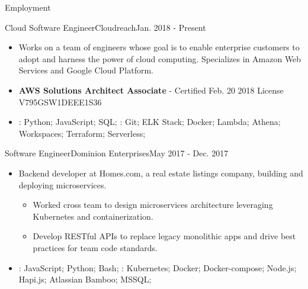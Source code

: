 \documentclass[]{mcdowellcv}
\begin{document}
    \makeheader

    \begin{cvsection}{Employment}


        \begin{cvsubsection}{Cloud Software Engineer}{Cloudreach}{Jan. 2018 - Present}
            \begin{itemize}
                \item Works on a team of engineers whose goal is to enable enterprise customers to adopt and harness the power of cloud computing. 
                Specializes in Amazon Web Services and Google Cloud Platform.
                \item \textbf{AWS Solutions Architect Associate} - Certified Feb. 20 2018  License V795GSW1DEEE1S36
            \end{itemize}
            \begin{itemize}
                 \item {}: Python; JavaScript; SQL; \newline
                : Git; ELK Stack; Docker; Lambda; Athena; Workspaces; Terraform; Serverless;
            \end{itemize}
        \end{cvsubsection}

        \begin{cvsubsection}{Software Engineer}{Dominion Enterprises}{May 2017 - Dec. 2017}
            \begin{itemize}
                \item Backend developer at Homes.com, a real estate listings company, building and deploying microservices.
                \begin{itemize}
                    \item Worked cross team to design microservices architecture leveraging Kubernetes and containerization.
                    \item Develop RESTful APIs to replace legacy monolithic apps and drive best practices for team code standards.  
                \end{itemize}
            \end{itemize}
            \begin{itemize}
                 \item {}: JavaScript; Python; Bash;  \newline
                : Kubernetes; Docker; Docker-compose; Node.js; Hapi.js; Atlassian Bamboo; MSSQL;
            \end{itemize}
        \end{cvsubsection}


\end{cvsection}
\end{document}
